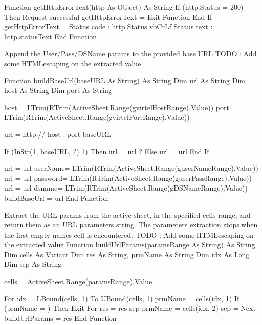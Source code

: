 \documentclass[letterpaper,10pt,english]{sphinxmanual}
\begin{document}
\begin{sphinxVerbatim}[commandchars=\\\{\}]
Function getHttpErrorText(http As Object) As String
      If (http.Status = 200) Then \PYGZsq{} Request successful
            getHttpErrorText = \PYGZdq{}\PYGZdq{}
            Exit Function
      End If
      getHttpErrorText = \PYGZdq{}Status code : \PYGZdq{} \PYGZam{} http.Status \PYGZam{} vbCrLf \PYGZus{}
               \PYGZam{} \PYGZdq{}Status text : \PYGZdq{} \PYGZam{} http.statusText
End Function

\PYGZsq{} Append the User/Pass/DSName params to the provided base URL
\PYGZsq{}
\PYGZsq{} TODO : Add some HTML\PYGZhy{}escaping on the extracted value
\PYGZsq{}

Function buildBaseUrl(baseURL As String) As String
      Dim url As String
      Dim host As String
      Dim port As String

      host = LTrim(RTrim(ActiveSheet.Range(g\PYGZus{}virtelHostRange).Value))
      port = LTrim(RTrim(ActiveSheet.Range(g\PYGZus{}virtelPortRange).Value))

      url = \PYGZdq{}http://\PYGZdq{} \PYGZam{} host \PYGZam{} \PYGZdq{}:\PYGZdq{} \PYGZam{} port \PYGZam{} baseURL

      If (InStr(1, baseURL, \PYGZdq{}?\PYGZdq{}) \PYGZlt{} 1) Then
            url = url \PYGZam{} \PYGZdq{}?\PYGZdq{}
      Else
            url = url \PYGZam{} \PYGZdq{}\PYGZam{}\PYGZdq{}
      End If

      url = url \PYGZam{} \PYGZdq{}userName=\PYGZdq{} \PYGZam{} LTrim(RTrim(ActiveSheet.Range(g\PYGZus{}userNameRange).Value))
      url = url \PYGZam{} \PYGZdq{}\PYGZam{}password=\PYGZdq{} \PYGZam{} LTrim(RTrim(ActiveSheet.Range(g\PYGZus{}userPassRange).Value))
      url = url \PYGZam{} \PYGZdq{}\PYGZam{}dsname=\PYGZdq{} \PYGZam{} LTrim(RTrim(ActiveSheet.Range(g\PYGZus{}DSNameRange).Value))
      buildBaseUrl = url
End Function


\PYGZsq{} Extract the \PYGZsq{}URL params\PYGZsq{} from the active sheet, in the specified cells range,
\PYGZsq{} and return them as an URL parameters string.
\PYGZsq{} The parameters extraction stops when the first empty name\PYGZsq{}s cell is encountered.
\PYGZsq{}
\PYGZsq{} TODO : Add some HTML\PYGZhy{}escaping on the extracted value
\PYGZsq{}
Function buildUrlParams(paramsRange As String) As String
      Dim cells As Variant
      Dim res As String, prmName As String
      Dim idx As Long
      Dim sep As String

      cells = ActiveSheet.Range(paramsRange).Value

      For idx = LBound(cells, 1) To UBound(cells, 1)
            prmName = cells(idx, 1)
            If (prmName = \PYGZdq{}\PYGZdq{}) Then Exit For
            res = res \PYGZam{} sep \PYGZam{} prmName \PYGZam{} \PYGZdq{}=\PYGZdq{} \PYGZam{} cells(idx, 2)
            sep = \PYGZdq{}\PYGZam{}\PYGZdq{}
      Next
      buildUrlParams = res
End Function



\end{sphinxVerbatim}
\end{document}
